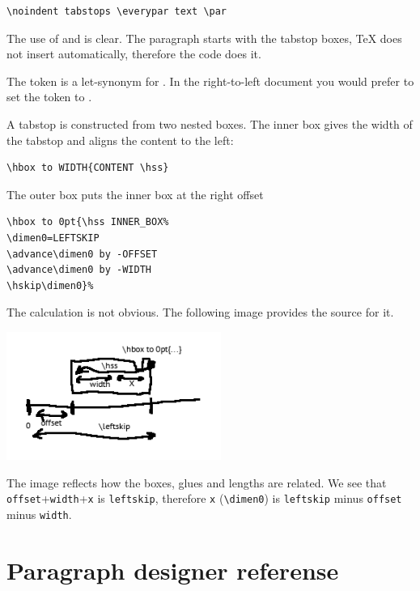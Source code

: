 \documentclass[]{ltugboat}
\begin{document}
\begin{verbatim}
\noindent tabstops \everypar text \par
\end{verbatim}

The use of  and  is clear. The paragraph starts with the tabstop boxes, \TeX{} does not insert  automatically, therefore the code does it.

The token  is a let-synonym for . In the right-to-left document you would prefer to set the token to .

A tabstop is constructed from two nested boxes. The inner box gives the width of the tabstop and aligns the content to the left:

\begin{verbatim}
\hbox to WIDTH{CONTENT \hss}
\end{verbatim}

The outer box puts the inner box at the right offset

\begin{verbatim}
\hbox to 0pt{\hss INNER_BOX%
\dimen0=LEFTSKIP
\advance\dimen0 by -OFFSET
\advance\dimen0 by -WIDTH
\hskip\dimen0}%
\end{verbatim}

The calculation is not obvious. The following image provides the source for it.

\includegraphics[width=7cm]{calculations.png}

The image reflects how the boxes, glues and lengths are related. We see that \verb|offset|+\verb|width|+\verb|x| is \verb|leftskip|, therefore \verb|x| (\verb|\dimen0|) is \verb|leftskip| minus \verb|offset| minus \verb|width|.


\section{Paragraph designer referense}
\end{document}
